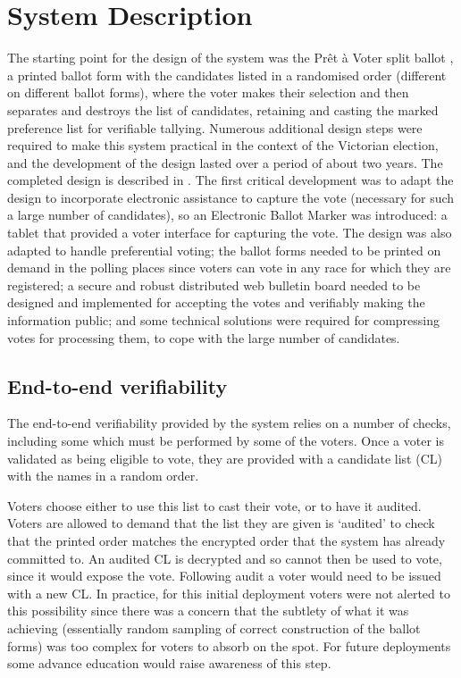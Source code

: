 \documentclass[twocolumn]{article}
\begin{document}
\section{System Description}

The starting point for the design of the system was the Pr\^et \`a Voter split ballot \cite{chaum05:e-vote}, a printed ballot form with the candidates listed in a randomised order (different on different ballot forms), where the voter makes their selection and then separates and destroys the list of candidates, retaining and casting the marked preference list for verifiable tallying.  Numerous additional design steps were required to make this system practical in the context of the Victorian election, and the development of the design lasted over a period of about two years.  The completed design is described in \cite{CRSTArXiV14}.   The first critical development was to adapt the design to incorporate electronic assistance to capture the vote (necessary for such a large number of candidates), so an Electronic Ballot Marker was introduced: a tablet that provided a voter interface for capturing the vote.  The design was also adapted to handle preferential voting; the ballot forms needed to be printed on demand in the polling places since voters can vote in any race for which they are registered; a secure and robust distributed web bulletin board needed to be designed and implemented for accepting the votes and verifiably making the information public; and some technical solutions were required for compressing votes for processing them, to cope with the large number of candidates.  



\subsection*{End-to-end verifiability}

The end-to-end verifiability provided by the system relies on a number of checks, including some which must be performed by some of the voters.   Once a voter is validated as being eligible to vote, they are provided with a candidate list (CL) with the names in a random order.  

Voters choose either to use this list to cast their vote, or to have it audited.  Voters are allowed to demand that the list they are given is `audited' to check that the printed order matches the encrypted order that the system has already committed to.  An audited CL is decrypted and so cannot then be used to vote, since it would expose the vote.  Following audit a voter would need to be issued with a new CL.  In practice, for this initial deployment voters were not alerted to this possibility since there was a concern that the subtlety of what it was achieving (essentially random sampling of correct construction of the ballot forms) was too complex for voters to absorb on the spot.  For future deployments some advance education would raise awareness of this step.
\end{document}
